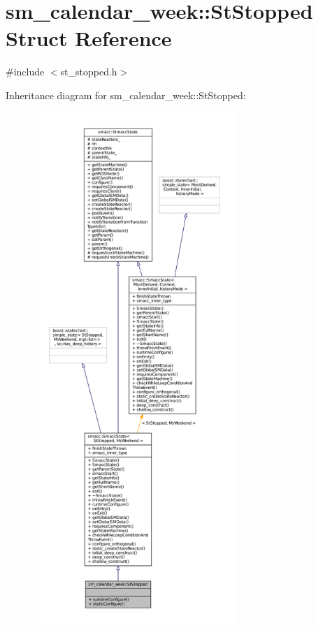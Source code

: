 \hypertarget{structsm__calendar__week_1_1StStopped}{}\section{sm\+\_\+calendar\+\_\+week\+:\+:St\+Stopped Struct Reference}
\label{structsm__calendar__week_1_1StStopped}


{\ttfamily \#include $<$st\+\_\+stopped.\+h$>$}



Inheritance diagram for sm\+\_\+calendar\+\_\+week\+:\+:St\+Stopped\+:
\nopagebreak
\begin{figure}[H]
\begin{center}
\leavevmode
\includegraphics[height=550pt]{structsm__calendar__week_1_1StStopped__inherit__graph}
\end{center}
\end{figure}


